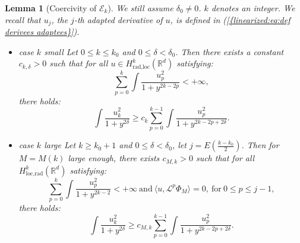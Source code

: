 \documentclass[11pt,a4paper,reqno]{amsart}
\newtheorem{lemma}[theorem]{Lemma}
\theoremstyle{remark}
\numberwithin{equation}{section}
\begin{document}
\begin{appendix}
\begin{lemma}[Coercivity of $\mathcal{E}_k$]\label{annexe:lem:coercivite des normes adaptees}
We still assume $\delta_0\neq 0$. $k$ denotes an integer. We recall that $u_j$, the $j$-th adapted derivative of $u$, is defined in {{\rm (\ref{{linearized:eq:def derivees adaptees}})}}.
\begin{itemize}
\item[(i)] \emph{case $k$ small} Let $0\leq k \leq k_0$ and $0\leq \delta< \delta_0$. Then there exists a constant $c_{k,\delta}>0$ such that for all $u\in H^{k}_{\text{rad},\text{loc}}(\mathbb{R}^d)$ satisfying:
\begin{equation}\label{annexe:eq:condition int coercivite normes adaptees}
\sum_{p=0}^{k} \int \frac{u_p^2}{1+y^{2k-2p}}<+\infty ,
\end{equation}
there holds:
\begin{equation}
\int \frac{u_k^2}{1+y^{2\delta}} \geq c_k \sum_{p=0}^{k-1} \int \frac{u_p^2}{1+y^{2k-2p+2\delta}} .
\end{equation}
\item[(ii)] \emph{case $k$ large} Let $k\geq k_0+1$ and $0\leq \delta< \delta_0$, let $j=E(\frac{k-k_0}{2})$. Then for $M=M(k)$ large enough, there exists $c_{M,k}>0$ such that for all $H^{k}_{\text{loc},\text{rad}}(\mathbb{R}^d)$ satisfying:
\begin{equation} \label{annexe:eq:condition inte pour coercivite}
\sum_{p=0}^{k} \int \frac{u_p^2}{1+y^{2k-2}}<+\infty \ \text{and} \ \langle u, \mathcal{L}^p \Phi_M \rangle=0, \ \text{for} \ 0\leq p \leq j-1,
\end{equation}
there holds:
\begin{equation}
\int \frac{u_k^2}{1+y^{2\delta}} \geq c_{M,k} \sum_{p=0}^{k-1} \int \frac{u^2_p}{1+y^{2k-2p+2\delta}} .
\end{equation}
\end{itemize}
\end{lemma}


\end{appendix}
\end{document}
